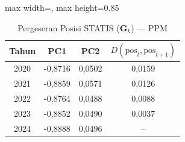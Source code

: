 \begin{table}[H]
\centering
\caption{Pergeseran Posisi STATIS ($\mathbf{G}_k$) --- PPM} \label{tab:app1jarak_statis_loading_ppm}
\begin{adjustbox}{max width=\textwidth, max height=0.85\textheight}
\begin{tabular}{|c|c|c|c|}
\hline
\textbf{Tahun} & \textbf{PC1} & \textbf{PC2} & \textbf{$D(\text{pos}_t, \text{pos}_{t+1})$} \\
\hline
2020 & -0,8716 & 0,0502 & 0,0159 \\
2021 & -0,8859 & 0,0571 & 0,0126 \\
2022 & -0,8764 & 0,0488 & 0,0088 \\
2023 & -0,8852 & 0,0490 & 0,0037 \\
2024 & -0,8888 & 0,0496 & -- \\
\hline
\end{tabular}
\end{adjustbox}
\end{table}